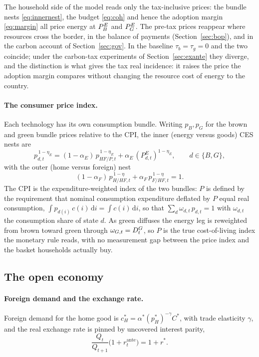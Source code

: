 The household side of the model reads only the tax-inclusive prices: the bundle
nests \eqref{eq:innernest}, the budget \eqref{eq:coh} and hence the adoption
margin \eqref{eq:margin} all price energy at $P^{E}_{B}$ and $P^{E}_{G}$. The pre-tax
prices reappear where resources cross the border, in the balance of payments
(Section~\ref{sec:bop}), and in the carbon account of Section~\ref{sec:gov}. In
the baseline $\tau_b=\tau_g=0$ and the two coincide; under the carbon-tax
experiments of Section~\ref{sec:exante} they diverge, and the distinction is what
gives the tax real incidence: it raises the price the adoption margin compares
without changing the resource cost of energy to the country.

\paragraph{The consumer price index.}
Each technology has its own consumption bundle. Writing $p_B,p_G$ for the brown
and green bundle prices relative to the CPI, the inner (energy versus goods) CES
nests are
%
\begin{equation}
p_{d,t}^{\,1-\eta_E}=(1-\alpha_E)\,p_{HF/P,t}^{\,1-\eta_E}+\alpha_E\,(P^E_{d,t})^{1-\eta_E},
\qquad d\in\{B,G\},
\label{eq:innernest}
\end{equation}
%
with the outer (home versus foreign) nest
%
\begin{equation}
(1-\alpha_F)\,p_{H/HF,t}^{\,1-\eta}+\alpha_F\,p_{F/HF,t}^{\,1-\eta}=1.
\label{eq:outernest}
\end{equation}
%
The CPI is the expenditure-weighted index of the two bundles: $P$ is defined by the
requirement that nominal consumption expenditure deflated by $P$ equal real
consumption, $\int p_{d(i)}\,c(i)\,\mathrm{d}i=\int c(i)\,\mathrm{d}i$, so that
$\sum_d \omega_{d,t}\,p_{d,t}=1$ with $\omega_{d,t}$ the consumption share of state $d$. As
green diffuses the energy leg is reweighted from brown toward green through
$\omega_{G,t}=D^{G}_t$, so $P$ is the true cost-of-living index the monetary rule reads, with no measurement
gap between the price index and the basket households actually buy.

\subsection{The open economy}\label{sec:open}\label{sec:bop}

\paragraph{Foreign demand and the exchange rate.}
Foreign demand for the home good is $c^{*}_H=\alpha^{*}(p^{*}_H)^{-\gamma}C^{*}$,
with trade elasticity $\gamma$, and the real exchange rate is pinned by uncovered
interest parity,
%
\begin{equation}
\frac{Q_t}{Q_{t+1}}\bigl(1+r^{\mathrm{ante}}_t\bigr)=1+r^{*}.
\label{eq:uip}
\end{equation}

